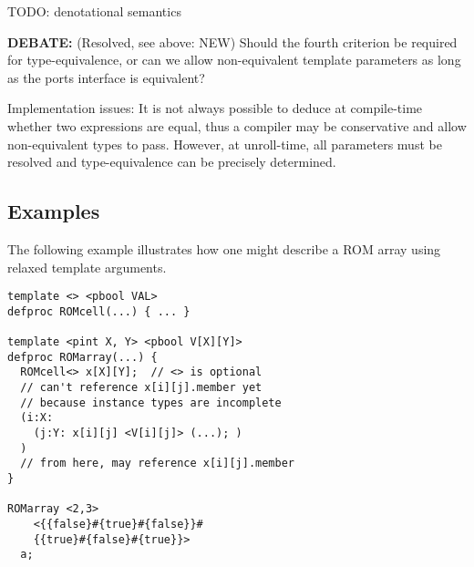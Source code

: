 TODO: denotational semantics

\begin{comment}
\textbf{OUTDATED:}
Two templated types are equivalence if and only if:
\begin{itemize}
\item They are of the same type class (channel, process,... ), obviously
\item They refer to the same base definition.  
\item The port types and dimensions are type-equivalent.  
\item Their template arguments are equal.  
\end{itemize}

The third and fourth criteria are not necessary equivalent.  
The ports of a template definition need not depend on template
parameters themselves, as is the case with defining 
cyclic source sequences for a channel.  
\end{comment}

\textbf{DEBATE:} (Resolved, see above: NEW)
Should the fourth criterion be required for type-equivalence, 
or can we allow non-equivalent template parameters as long as the
ports interface is equivalent?  

Implementation issues:
It is not always possible to deduce at compile-time whether
two expressions are equal, thus a compiler may be conservative
and allow non-equivalent types to pass.  
However, at unroll-time, all parameters must be resolved
and type-equivalence can be precisely determined.  

\subsection{Examples}
\label{sec:templates:equivalence:examples}

The following example illustrates how one might describe a ROM array
using relaxed template arguments.

\begin{verbatim}
template <> <pbool VAL>
defproc ROMcell(...) { ... }

template <pint X, Y> <pbool V[X][Y]>
defproc ROMarray(...) {
  ROMcell<> x[X][Y];  // <> is optional
  // can't reference x[i][j].member yet 
  // because instance types are incomplete
  (i:X:
    (j:Y: x[i][j] <V[i][j]> (...); )
  )
  // from here, may reference x[i][j].member
}

ROMarray <2,3>
    <{{false}#{true}#{false}}#
    {{true}#{false}#{true}}>
  a;
\end{verbatim}

